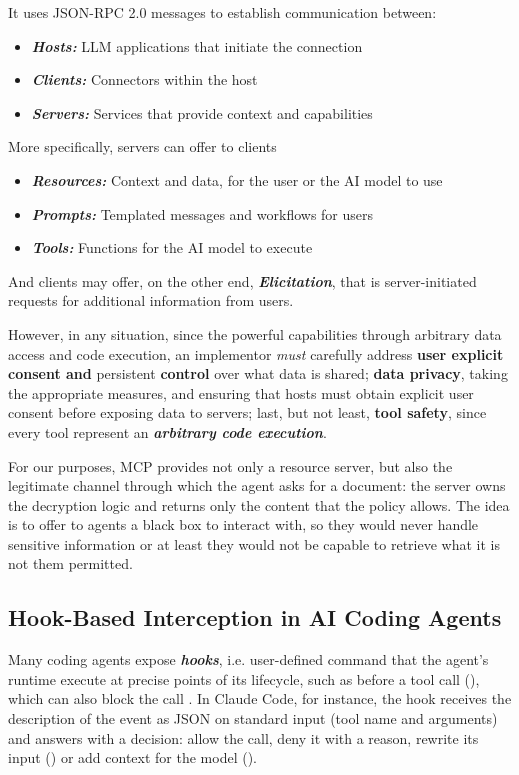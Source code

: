 It uses JSON-RPC 2.0 messages to establish communication between:
\begin{itemize}
    \item \textbf{\textit{Hosts:}} LLM applications that initiate the connection
    \item \textbf{\textit{Clients:}} Connectors within the host
    \item \textbf{\textit{Servers:}} Services that provide context and capabilities
\end{itemize}
More specifically, servers can offer to clients
\begin{itemize}
    \item \textbf{\textit{Resources:}} Context and data, for the user or the AI model to use
    \item \textbf{\textit{Prompts:}} Templated messages and workflows for users
    \item \textbf{\textit{Tools:}} Functions for the AI model to execute
\end{itemize}
And clients may offer, on the other end, \textbf{\textit{Elicitation}}, that is server-initiated requests for additional information from users.

However, in any situation, since the powerful capabilities through arbitrary data access and code execution, an implementor \textit{must} carefully address \textbf{user explicit consent and} persistent \textbf{control} over what data is shared; \textbf{data privacy}, taking the appropriate measures, and ensuring that hosts must obtain explicit user consent before exposing data to servers; last, but not least, \textbf{tool safety}, since every tool represent an \textit{\textbf{arbitrary code execution}}.

For our purposes, MCP provides not only a resource server, but also the legitimate channel through which the agent asks for a document: the server owns the decryption logic and returns only the content that the policy allows. The idea is to offer to agents a black box to interact with, so they would never handle sensitive information or at least they would not be capable to retrieve what it is not them permitted.
\subsection{Hook-Based Interception in AI Coding Agents}
Many coding agents expose \textbf{\textit{hooks}}, i.e. user-defined command that the agent's runtime execute at precise points of its lifecycle, such as before a tool call (), which can also block the call \cite{claudehooks,copilothooks}.
In Claude Code, for instance, the hook receives the description of the event as JSON on standard input (tool name and arguments) and answers with a decision: allow the call, deny it with a reason, rewrite its input () or add context for the model ().


